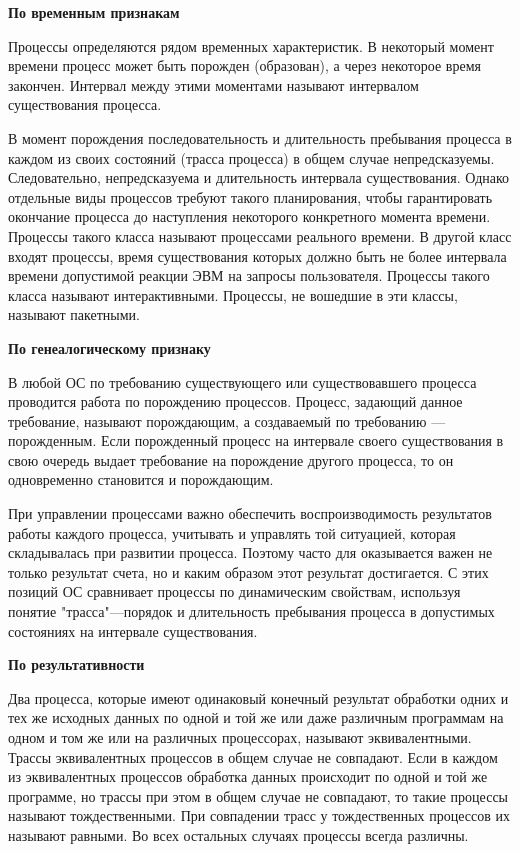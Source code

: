 \textbf{По временным признакам}

Процессы определяются рядом временных характеристик. В некоторый момент времени процесс может быть порожден (образован), а через некоторое время закончен. Интервал между этими моментами называют интервалом существования процесса.

В момент порождения последовательность и длительность пребывания процесса в каждом из своих состояний (трасса процесса) в общем случае непредсказуемы. Следовательно, непредсказуема и длительность интервала существования. Однако отдельные виды процессов требуют такого планирования, чтобы гарантировать окончание процесса до наступления некоторого конкретного момента времени. Процессы такого класса называют процессами реального времени. В другой класс входят процессы, время существования которых должно быть не более интервала времени допустимой реакции ЭВМ на запросы пользователя. Процессы такого класса называют интерактивными. Процессы, не вошедшие в эти классы, называют пакетными.
\newline

\textbf{По генеалогическому признаку}

В любой ОС по требованию существующего или существовавшего процесса проводится работа по порождению процессов. Процесс, задающий данное требование, называют порождающим, а создаваемый по требованию — порожденным. Если порожденный процесс на интервале своего существования в свою очередь выдает требование на порождение другого процесса, то он одновременно становится и порождающим.

При управлении процессами важно обеспечить воспроизводимость результатов работы каждого процесса, учитывать и управлять той ситуацией, которая складывалась при развитии процесса. Поэтому часто для оказывается важен не только результат счета, но и каким образом этот результат достигается. С этих позиций ОС сравнивает процессы по динамическим свойствам, используя понятие "трасса"—порядок и длительность пребывания процесса в допустимых состояниях на интервале существования.
\newline

\textbf{По результативности}

Два процесса, которые имеют одинаковый конечный результат обработки одних и тех же исходных данных по одной и той же или даже различным программам на одном и том же или на различных процессорах, называют эквивалентными. Трассы эквивалентных процессов в общем случае не совпадают. Если в каждом из эквивалентных процессов обработка данных происходит по одной и той же программе, но трассы при этом в общем случае не совпадают, то такие процессы называют тождественными. При совпадении трасс у тождественных процессов их называют равными. Во всех остальных случаях процессы всегда различны.
\newline

